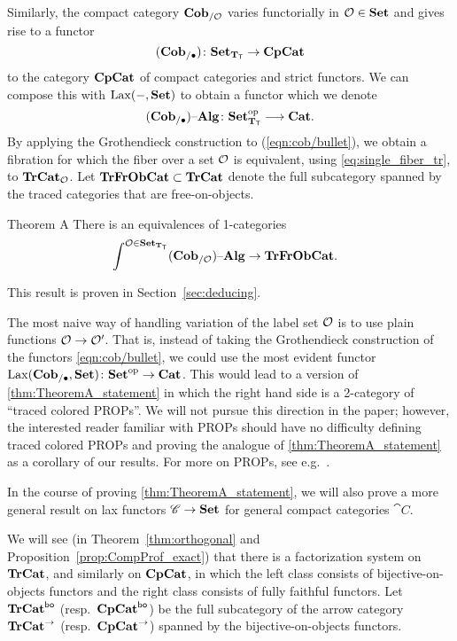 \documentclass[11pt,oneside,article]{memoir}
\begin{document}
Similarly, the compact category $\mathbf{Cob}_{/\mathcal{O}}$ varies functorially in $\mathcal{O}\in\mathbf{Set}$ and gives rise to a functor
\[(\mathbf{Cob}_{/\bullet})\colon\mathbf{Set}_{\mathbf{T}_{\mathsf{T}}}\to\mathbf{CpCat}\]
to the category $\mathbf{CpCat}$ of compact categories and strict functors. %
We can compose this with $\operatorname{Lax}(-,\mathbf{Set})$ to obtain a functor which we denote
\begin{equation}
      \label{eqn:cob/bullet}
   (\mathbf{Cob}_{/\bullet}){\text \textendash}\mathbf{Alg}\colon\mathbf{Set}_{\mathbf{T}_{\mathsf{T}}}^{\mathrm{op}}\longrightarrow\mathbf{Cat}.
\end{equation}
By applying the Grothendieck construction to (\ref{eqn:cob/bullet}), we obtain a fibration for which the fiber over a set $\mathcal{O}$ is equivalent, using \eqref{eq:single_fiber_tr}, to $\mathbf{TrCat}_{\mathcal{O}}$.  Let $\mathbf{TrFrObCat}\subset\mathbf{TrCat}$ denote the full subcategory spanned by the traced categories that are free-on-objects.
\begin{named}{Theorem A}
      \label{thm:TheoremA_statement}
  There is an equivalences of 1-categories
  \begin{align*}
     &\int^{\mathcal{O}\in\mathbf{Set}_{\mathbf{T}_{\mathsf{T}}}}(\mathbf{Cob}_{/\mathcal{O}}){\text \textendash}\mathbf{Alg} \to \mathbf{TrFrObCat}.
  \end{align*}
\end{named}
This result is proven in Section~\ref{sec:deducing}.

\begin{remark}
   The most naive way of handling variation of the label set $\mathcal{O}$ is to use plain functions $\mathcal{O}\to\mathcal{O}'$. That is, instead of taking the Grothendieck construction of the functors \eqref{eqn:cob/bullet}, we could use the most evident functor $\operatorname{Lax}(\mathbf{Cob}_{/\bullet},\mathbf{Set})\colon{\mathbf{Set}}^{\text{op}}\to\mathbf{Cat}$. This would lead to a version of \ref{thm:TheoremA_statement} in which the right hand side is a 2-category of ``traced colored PROPs''. We will not pursue this direction in the paper; however, the interested reader familiar with PROPs should have no difficulty defining traced colored PROPs and proving the analogue of \ref{thm:TheoremA_statement} as a corollary of our results. For more on PROPs, see e.g.~\cite{HackneyRobertson}.
\end{remark}

In the course of proving \ref{thm:TheoremA_statement}, we will also prove a more general result
on lax functors $\mathscr{C}\to\mathbf{Set}$ for general compact categories $\cat{C}$.

We will see (in Theorem~\ref{thm:orthogonal} and Proposition~\ref{prop:CompProf_exact}) that there
is a factorization system on $\mathbf{TrCat}$, and similarly on $\mathbf{CpCat}$, in which the left class consists
of bijective-on-objects functors and the right class consists of fully faithful functors. Let
$\mathbf{TrCat}^{\mathsf{bo}}$ (resp.\ $\mathbf{CpCat}^{\mathsf{bo}}$) be the full subcategory of the arrow category $\mathbf{TrCat}^{\to}$
(resp.\ $\mathbf{CpCat}^{\to}$) spanned by the bijective-on-objects functors.
\end{document}
